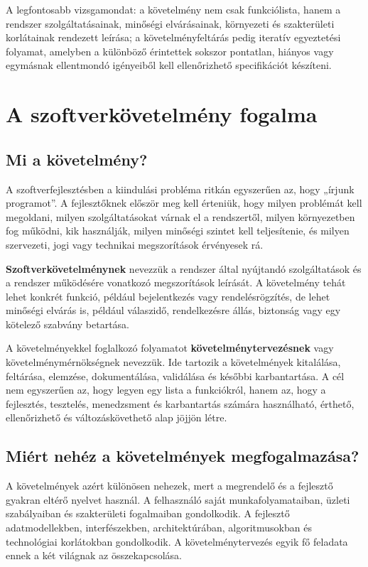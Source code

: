 A legfontosabb vizsgamondat: a követelmény nem csak funkciólista, hanem a rendszer szolgáltatásainak, minőségi elvárásainak, környezeti és szakterületi korlátainak rendezett leírása; a követelményfeltárás pedig iteratív egyeztetési folyamat, amelyben a különböző érintettek sokszor pontatlan, hiányos vagy egymásnak ellentmondó igényeiből kell ellenőrizhető specifikációt készíteni.

\section{A szoftverkövetelmény fogalma}

\subsection{Mi a követelmény?}

A szoftverfejlesztésben a kiindulási probléma ritkán egyszerűen az, hogy „írjunk programot”. A fejlesztőknek először meg kell érteniük, hogy milyen problémát kell megoldani, milyen szolgáltatásokat várnak el a rendszertől, milyen környezetben fog működni, kik használják, milyen minőségi szintet kell teljesítenie, és milyen szervezeti, jogi vagy technikai megszorítások érvényesek rá.

\textbf{Szoftverkövetelménynek} nevezzük a rendszer által nyújtandó szolgáltatások és a rendszer működésére vonatkozó megszorítások leírását. A követelmény tehát lehet konkrét funkció, például bejelentkezés vagy rendelésrögzítés, de lehet minőségi elvárás is, például válaszidő, rendelkezésre állás, biztonság vagy egy kötelező szabvány betartása.

A követelményekkel foglalkozó folyamatot \textbf{követelménytervezésnek} vagy követelménymérnökségnek nevezzük. Ide tartozik a követelmények kitalálása, feltárása, elemzése, dokumentálása, validálása és későbbi karbantartása. A cél nem egyszerűen az, hogy legyen egy lista a funkciókról, hanem az, hogy a fejlesztés, tesztelés, menedzsment és karbantartás számára használható, érthető, ellenőrizhető és változáskövethető alap jöjjön létre.

\subsection{Miért nehéz a követelmények megfogalmazása?}

A követelmények azért különösen nehezek, mert a megrendelő és a fejlesztő gyakran eltérő nyelvet használ. A felhasználó saját munkafolyamataiban, üzleti szabályaiban és szakterületi fogalmaiban gondolkodik. A fejlesztő adatmodellekben, interfészekben, architektúrában, algoritmusokban és technológiai korlátokban gondolkodik. A követelménytervezés egyik fő feladata ennek a két világnak az összekapcsolása.

